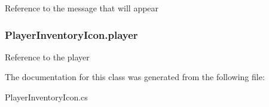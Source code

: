 Reference to the message that will appear \hypertarget{class_player_inventory_icon_af275fab92eb9bacfad048d1506dbd128}{
\subsubsection[{player}]{ Player\-Inventory\-Icon.\-player}}\label{class_player_inventory_icon_af275fab92eb9bacfad048d1506dbd128}
Reference to the player 

The documentation for this class was generated from the following file\-:\begin{DoxyCompactItemize}
\item 
Player\-Inventory\-Icon.\-cs\end{DoxyCompactItemize}
